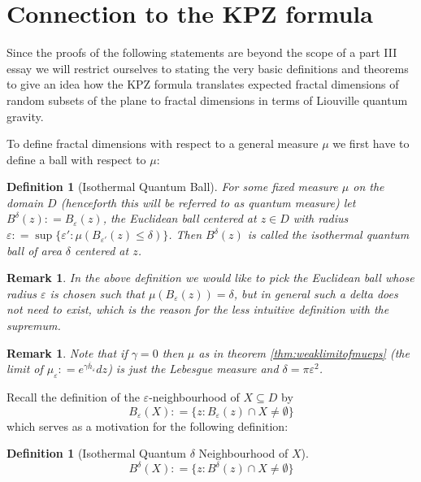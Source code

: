 \documentclass[11pt,reqno]{amsart}
\numberwithin{equation}{section}
\newtheorem{defi}[thm]{Definition}
\newtheorem{rem}[thm]{Remark}
\newcommand{\deq}{\mathrel{\mathop:}=}
\newcommand{\eps}{\varepsilon}
\begin{document}
\section{Connection to the KPZ formula}

Since the proofs of the following statements are beyond the scope of a part III essay we will restrict ourselves to stating the very basic definitions and theorems to give an idea how the KPZ formula translates expected fractal dimensions of random subsets of the plane to fractal dimensions in terms of Liouville quantum gravity.

To define fractal dimensions with respect to a general measure $\mu$ we first have to define a ball with respect to $\mu$:
\begin{defi}[Isothermal Quantum Ball]
	For some fixed measure $\mu$ on the domain $D$ (henceforth this will be referred to as \emph{quantum measure}) let $B^\delta(z)\deq B_\eps(z)$, the Euclidean ball centered at $z\in D$ with radius $\eps\deq\sup\{\eps':\mu(B_{\eps'}(z)\leq\delta)\}$. Then $B^\delta(z)$ is called the \emph{isothermal quantum ball} of area $\delta$ centered at $z$.
\end{defi}
\begin{rem}
	In the above definition we would like to pick the Euclidean ball whose radius $\eps$ is chosen such that $\mu(B_\eps(z))=\delta$, but in general such a delta does not need to exist, which is the reason for the less intuitive definition with the supremum.
\end{rem}
\begin{rem}
	Note that if $\gamma=0$ then $\mu$ as in theorem \ref{thm:weaklimitofmueps} (the limit of $\mu_\eps\deq e^{\gamma\overline h_\eps}dz$) is just the Lebesgue measure and $\delta=\pi\eps^2$.
\end{rem}
Recall the definition of the $\eps$-neighbourhood of $X\subseteq D$ by $$B_\eps(X)\deq \{z:B_\eps(z)\cap X\neq\emptyset \}$$ which serves as a motivation for the following definition:
\begin{defi}[Isothermal Quantum $\delta$ Neighbourhood of $X$]
	$$B^\delta(X)\deq \{z:B^\delta(z)\cap X\neq\emptyset\}$$
\end{defi}
\end{document}
